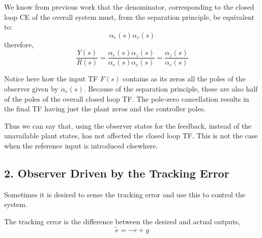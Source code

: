 We know from previous work that the denominator, corresponding to the closed loop CE of the overall system must, from the separation principle, be equivalent to:
\[
\alpha_e(s)\alpha_c(s)
\]
therefore,
\[
\frac{{Y(s)}}{{R(s)}} = \frac{{\alpha _e (s)\alpha _z (s)}}{{\alpha _e (s)\alpha _c (s)}} = \frac{{\alpha _z (s)}}{{\alpha _c (s)}}
\]

Notice here how the input TF $F(s)$ contains as its zeros all the poles of the observer given by $\alpha_e(s)$.
Because of the separation principle, these are also half of the poles of the overall closed loop TF.
The pole-zero cancellation results in the final TF having just the plant zeros and the controller poles.

Thus we can say that, using the observer states for the feedback, instead of the unavailable plant states, has not affected the closed loop TF.
This is not the case when the reference input is introduced elsewhere.




 
\subsection*{2. Observer Driven by the Tracking Error
} %
\label{sub:2_observer_driven_by_the_tracking_error_}

Sometimes it is desired to sense the tracking error and use this to control the system.

The tracking error is the difference between the desired and actual outputs,
\[
\tilde e =  - r + y
\]

